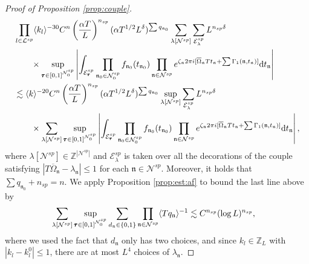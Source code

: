 \documentclass[UTF-8,reqno]{amsart}
\numberwithin{equation}{section}
\theoremstyle{definition}
\def\dif{{\mathord{{\rm d}}}}
\def\leq{\leqslant}
\def\dif{{\mathord{{\rm d}}}}
\def\leq{\leqslant}
\begin{document}
\begin{proof}[Proof of Proposition \ref{prop:couple}]
\begin{align}
 &\prod_{l\in\mathcal{L}^{sp}}\langle k_l\rangle^{-30} C^{n}\left( \frac{\alpha T}{L}\right)^{n_{{sp}}}(\alpha  T^{1/2} L^\delta)^{\sum q_{\mathfrak{n}_0}} \sum_{{\lambda[\mathcal N^{sp}]}}\sum_{\mathcal{E}_\lambda^{sp}}  %
 L^{n_{sp}\delta} \notag\\
      & \quad \quad\times 
\sup_{\pmb \tau \in [0,1]^{\mathcal N_0^{sp}}} \left|\int_{\mathcal{E}^{sp}_{\pmb{\tau}}}\prod_{\mathfrak{n}_0 \in \mathcal{N}^{sp}_0}f_{\mathfrak{n}_0}(t_{\mathfrak n_0})\prod_{\mathfrak{n} \in \mathcal{N}^{sp}}e^{\zeta_\mathfrak{n}2\pi i[\overline\Omega_\mathfrak{n}Tt_\mathfrak{n}+\sum\Gamma_1(\mathfrak{n},t_\mathfrak{n})]  } \dif  t_{\mathfrak{n}}\right|\notag\\
      &\lesssim \langle k\rangle^{-20} C^{n}\left( \frac{\alpha T}{L}\right)^{n_{{{sp}}}}(\alpha  T^{1/2} L^\delta)^{\sum q_{\mathfrak{n}_0}} \sup_{\lambda[\mathcal N^{{sp}}]}\sum_{\mathcal E_{\lambda }^{{sp}}}%
      L^{n_{sp}\delta}\notag\\
      & \quad \quad\times\sum_{{\lambda[\mathcal N^{sp}]}}\sup_{\pmb \tau \in [0,1]^{\mathcal N_0^{sp}}}\left|\int_{\mathcal{E}^{sp}_{\pmb{\tau}}}\prod_{\mathfrak{n}_0 \in \mathcal{N}^{sp}_0}f_{\mathfrak{n}_0}(t_{\mathfrak n_0})\prod_{\mathfrak{n} \in \mathcal{N}^{sp}}e^{\zeta_\mathfrak{n}2\pi i[\overline\Omega_\mathfrak{n}Tt_\mathfrak{n}+\sum\Gamma_1(\mathfrak{n},t_\mathfrak{n})]  } \dif t_{\mathfrak{n}}\right|,\label{eq-sp1}
    \end{align}
    where $\lambda[\mathcal N^{sp}] \in \mathbb{Z}^{|\mathcal N^{sp}|}$ and ${\mathcal E}_{\lambda}^{sp}$ is taken over all the decorations of the couple satisfying $|T\overline\Omega_{\mathfrak n} - \lambda_{\mathfrak n}| \leq 1$ for each $\mathfrak n \in \mathcal N^{sp}$. Moreover, it holds that $\sum q_{\mathfrak{n}_0}+ n_{sp} = n$. We apply Proposition \ref{prop:est:af} to bound the last line above by
    \begin{align}
        &\sum_{{\lambda[\mathcal N^{sp}]}}\sup_{\pmb \tau \in [0,1]^{\mathcal N_0^{sp}}}\sum_{d_\mathfrak{n}\in\{0,1\}}\prod_{\mathfrak{n}\in\mathcal{N}^{sp}}\langle Tq_\mathfrak{n}\rangle^{-1}
        \lesssim C^{n_{sp}} (\log L)^{n_{sp}},\notag
    \end{align}
    where we used the fact that $d_\mathfrak{n}$ only has two choices, and since $k_l\in\mathbb{Z}_L$ with $|k_l-k_l^0|\leq1$, there are at most $L^{4}$ choices of $\lambda_\mathfrak{n}$.


\end{proof}
\end{document}
